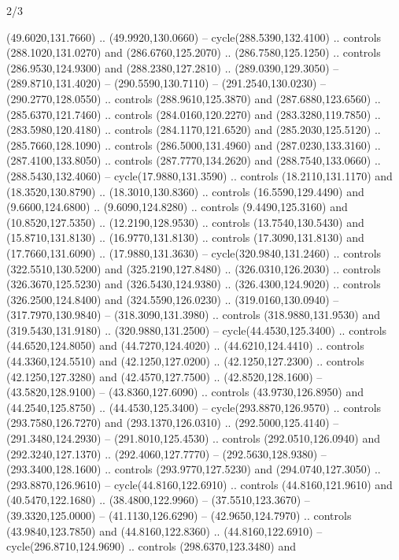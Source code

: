 \begin{flagdescription}{2/3}
\begin{scope}[xshift=0.5\flaglength,yshift=0.5\flagwidth,scale=\stretchfactor]
\begin{scope}[scale=0.001645\flagwidth,yshift=65mm,xshift=-63mm]
\begin{scope}[y=0.80pt, x=0.80pt, yscale=-1,]
\begin{scope}[cm={{1.33333,0.0,0.0,1.33333,(0.0,1e-05)}}]
  (49.6020,131.7660) .. (49.9920,130.0660) -- cycle(288.5390,132.4100) ..
  controls (288.1020,131.0270) and (286.6760,125.2070) .. (286.7580,125.1250) ..
  controls (286.9530,124.9300) and (288.2380,127.2810) .. (289.0390,129.3050) --
  (289.8710,131.4020) -- (290.5590,130.7110) -- (291.2540,130.0230) --
  (290.2770,128.0550) .. controls (288.9610,125.3870) and (287.6880,123.6560) ..
  (285.6370,121.7460) .. controls (284.0160,120.2270) and (283.3280,119.7850) ..
  (283.5980,120.4180) .. controls (284.1170,121.6520) and (285.2030,125.5120) ..
  (285.7660,128.1090) .. controls (286.5000,131.4960) and (287.0230,133.3160) ..
  (287.4100,133.8050) .. controls (287.7770,134.2620) and (288.7540,133.0660) ..
  (288.5430,132.4060) -- cycle(17.9880,131.3590) .. controls (18.2110,131.1170)
  and (18.3520,130.8790) .. (18.3010,130.8360) .. controls (16.5590,129.4490)
  and (9.6600,124.6800) .. (9.6090,124.8280) .. controls (9.4490,125.3160) and
  (10.8520,127.5350) .. (12.2190,128.9530) .. controls (13.7540,130.5430) and
  (15.8710,131.8130) .. (16.9770,131.8130) .. controls (17.3090,131.8130) and
  (17.7660,131.6090) .. (17.9880,131.3630) -- cycle(320.9840,131.2460) ..
  controls (322.5510,130.5200) and (325.2190,127.8480) .. (326.0310,126.2030) ..
  controls (326.3670,125.5230) and (326.5430,124.9380) .. (326.4300,124.9020) ..
  controls (326.2500,124.8400) and (324.5590,126.0230) .. (319.0160,130.0940) --
  (317.7970,130.9840) -- (318.3090,131.3980) .. controls (318.9880,131.9530) and
  (319.5430,131.9180) .. (320.9880,131.2500) -- cycle(44.4530,125.3400) ..
  controls (44.6520,124.8050) and (44.7270,124.4020) .. (44.6210,124.4410) ..
  controls (44.3360,124.5510) and (42.1250,127.0200) .. (42.1250,127.2300) ..
  controls (42.1250,127.3280) and (42.4570,127.7500) .. (42.8520,128.1600) --
  (43.5820,128.9100) -- (43.8360,127.6090) .. controls (43.9730,126.8950) and
  (44.2540,125.8750) .. (44.4530,125.3400) -- cycle(293.8870,126.9570) ..
  controls (293.7580,126.7270) and (293.1370,126.0310) .. (292.5000,125.4140) --
  (291.3480,124.2930) -- (291.8010,125.4530) .. controls (292.0510,126.0940) and
  (292.3240,127.1370) .. (292.4060,127.7770) -- (292.5630,128.9380) --
  (293.3400,128.1600) .. controls (293.9770,127.5230) and (294.0740,127.3050) ..
  (293.8870,126.9610) -- cycle(44.8160,122.6910) .. controls (44.8160,121.9610)
  and (40.5470,122.1680) .. (38.4800,122.9960) -- (37.5510,123.3670) --
  (39.3320,125.0000) -- (41.1130,126.6290) -- (42.9650,124.7970) .. controls
  (43.9840,123.7850) and (44.8160,122.8360) .. (44.8160,122.6910) --
  cycle(296.8710,124.9690) .. controls (298.6370,123.3480) and

\end{scope}
\end{scope}
\end{scope}
\end{scope}
\end{flagdescription}
